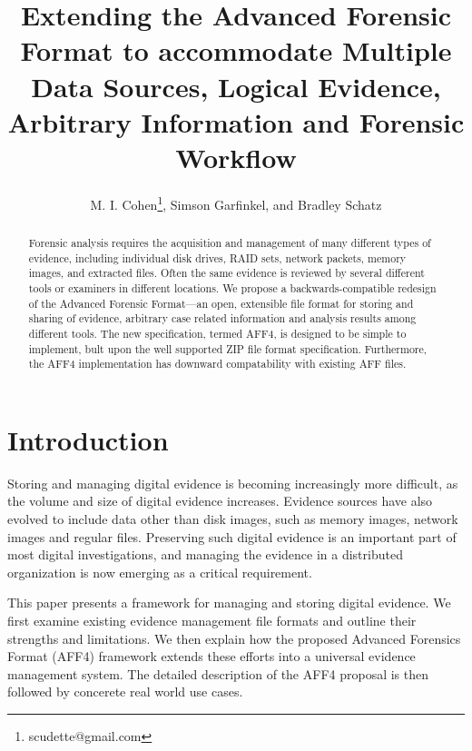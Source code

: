 \documentclass[10pt, conference]{IEEEtran}
\begin{document}
\title{Extending the Advanced Forensic Format to accommodate Multiple
  Data Sources, Logical Evidence, Arbitrary Information and Forensic Workflow}
\author{M. I. Cohen\footnote{scudette@gmail.com}, Simson Garfinkel, and Bradley Schatz}
\maketitle

\begin{abstract}
Forensic analysis requires the acquisition and management of many
different types of evidence, including individual disk drives, RAID
sets, network packets, memory images, and extracted files. Often the
same evidence is reviewed by several different tools or examiners in
different locations. We propose a backwards-compatible redesign of the
Advanced Forensic Format---an open, extensible file format for storing
and sharing of evidence, arbitrary case related information and
analysis results among different tools. The new specification, termed
AFF4, is designed to be simple to implement, bult upon the well
supported ZIP file format specification. Furthermore, the AFF4 implementation has
downward compatability with existing AFF files.
\end{abstract}

\section{Introduction}
Storing and managing digital evidence is becoming increasingly more
difficult, as the volume and size of digital evidence increases. Evidence
sources have also evolved to include data
other than disk images, such as memory images, network images and
regular files. Preserving such digital evidence is an important part of
most digital investigations\cite{carrier:event-based}, and managing
the evidence in a distributed organization is now emerging as a
critical requirement.

This paper presents a framework for managing and storing digital
evidence. We first examine existing evidence management file formats
and outline their strengths and limitations. We then explain how the
proposed Advanced Forensics Format (AFF4) framework extends these
efforts into a universal evidence management system. The detailed
description of the AFF4 proposal is then followed by concerete real
world use cases.
\end{document}
